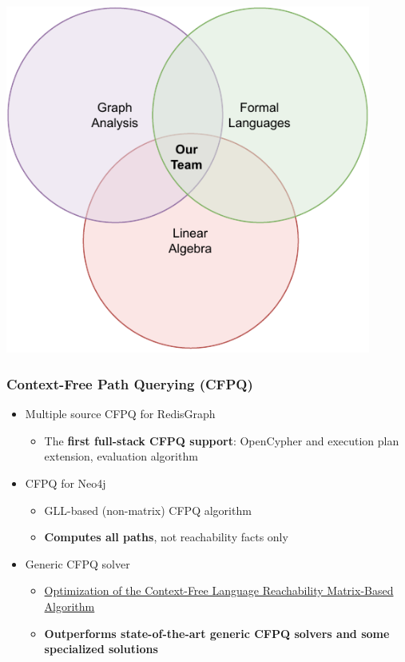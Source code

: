 \documentclass[xcolor=table,aspectratio=169]{beamer}
\begin{document}
\begin{frame}[fragile]
\begin{minipage}{0.4\textwidth}
    \includegraphics[width = 0.9\textwidth]{pictures/ResearchArea.drawio.pdf}
  \end{minipage}
\end{frame}

\begin{frame}[fragile]
  \frametitle{Context-Free Path Querying (CFPQ)}
  \begin{itemize}
    \item Multiple source CFPQ for RedisGraph
    \begin{itemize}
      \item The \textbf{first full-stack CFPQ support}: OpenCypher and execution plan extension, evaluation algorithm
    \end{itemize}
    \item CFPQ for Neo4j
      \begin{itemize}
        \item GLL-based (non-matrix) CFPQ algorithm 
        \item \textbf{Computes all paths}, not reachability facts only
      \end{itemize}
    \item Generic CFPQ solver
    \begin{itemize}
      \item \href{https://arxiv.org/abs/2401.11029}{Optimization of the Context-Free Language Reachability Matrix-Based Algorithm}
      \item \textbf{Outperforms state-of-the-art generic CFPQ solvers and some specialized solutions}
    \end{itemize}
  \end{itemize}
\end{frame}
\end{document}
